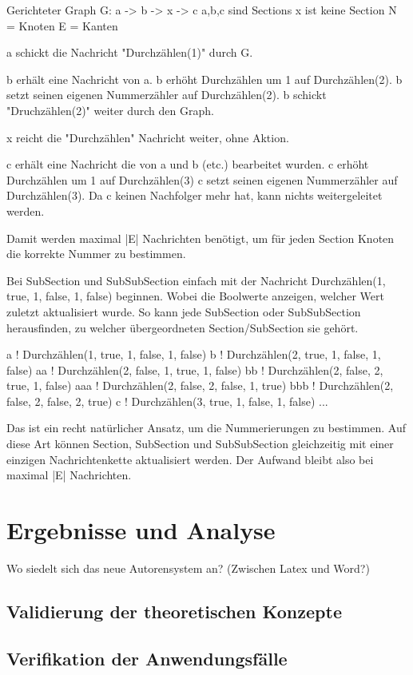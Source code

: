 Gerichteter Graph G: a -> b -> x -> c
a,b,c sind Sections
x ist keine Section
N = Knoten
E = Kanten

a schickt die Nachricht "Durchzählen(1)" durch G.

b erhält eine Nachricht von a.
b erhöht Durchzählen um 1 auf Durchzählen(2).
b setzt seinen eigenen Nummerzähler auf Durchzählen(2).
b schickt "Druchzählen(2)" weiter durch den Graph.

x reicht die "Durchzählen" Nachricht weiter, ohne Aktion.

c erhält eine Nachricht die von a und b (etc.) bearbeitet wurden.
c erhöht Durchzählen um 1 auf Durchzählen(3)
c setzt seinen eigenen Nummerzähler auf Durchzählen(3).
Da c keinen Nachfolger mehr hat, kann nichts weitergeleitet werden.

Damit werden maximal |E| Nachrichten benötigt, um für jeden Section Knoten
die korrekte Nummer zu bestimmen.


Bei SubSection und SubSubSection einfach mit der
Nachricht Durchzählen(1, true, 1, false, 1, false) beginnen.
Wobei die Boolwerte anzeigen, welcher Wert zuletzt aktualisiert wurde.
So kann jede SubSection oder SubSubSection herausfinden, zu welcher
übergeordneten Section/SubSection sie gehört.

a ! Durchzählen(1, true, 1, false, 1, false)
b ! Durchzählen(2, true, 1, false, 1, false)
aa ! Durchzählen(2, false, 1, true, 1, false)
bb ! Durchzählen(2, false, 2, true, 1, false)
aaa ! Durchzählen(2, false, 2, false, 1, true)
bbb ! Durchzählen(2, false, 2, false, 2, true)
c ! Durchzählen(3, true, 1, false, 1, false)
...

Das ist ein recht natürlicher Ansatz, um die Nummerierungen zu bestimmen.
Auf diese Art können Section, SubSection und SubSubSection gleichzeitig
mit einer einzigen Nachrichtenkette aktualisiert werden.
Der Aufwand bleibt also bei maximal |E| Nachrichten.


\chapter{Ergebnisse und Analyse}

Wo siedelt sich das neue Autorensystem an? (Zwischen Latex und Word?)

\section{Validierung der theoretischen Konzepte}

\section{Verifikation der Anwendungsfälle}


